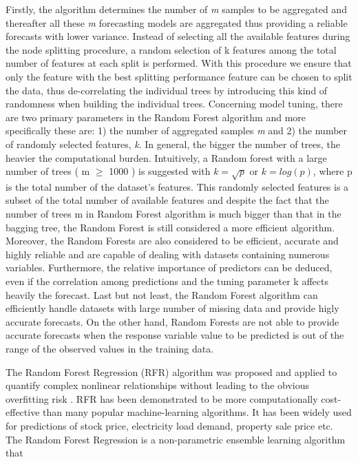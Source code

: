 Firstly, the algorithm determines the number of \textit{m} samples to be aggregated and thereafter all these \textit{m} forecasting models are aggregated thus providing a reliable forecasts with lower variance. Instead of selecting all the available features during the node splitting procedure, a random selection of k features among the total number of features at each split is performed. With this procedure we ensure that only the feature with the best splitting performance feature can be chosen to split the data, thus de-correlating the individual trees by introducing this kind of
randomness when building the individual trees. Concerning model tuning, there are two primary parameters in the Random Forest algorithm and more specifically these are: 1) the number of aggregated samples \textit{m} and 2) the number of randomly selected features, \textit{k}. In general, the bigger the number of trees, the heavier the computational burden. Intuitively, a Random forest with a large number of trees ( m $\geq$ 1000 ) is suggested with $k=\sqrt{p}$ or $k=log(p)$, where p is the total number of the dataset's features. This randomly selected features is a subset of the total number of available features and despite the fact that the number of trees m in Random Forest algorithm is much bigger than that in the bagging tree, the Random Forest is still considered a more efficient algorithm. Moreover, the Random Forests are also considered to be efficient, accurate and highly reliable and are capable of dealing with datasets containing numerous variables. Furthermore, the relative importance of predictors can be deduced, even if the correlation among predictions and the tuning parameter k affects heavily the forecast. Last but not least, the Random Forest algorithm can efficiently handle datasets with large number of missing data and provide higly accurate forecasts. On the other hand, Random Forests are not able to provide accurate forecasts when the response variable value to be predicted is out of the range of the observed values in the training data. 
\par The Random Forest Regression (RFR) algorithm was proposed and applied to quantify complex
nonlinear relationships without leading to the obvious overfitting risk \cite{segal2004machine}. RFR has been demonstrated
to be more computationally cost-effective than many popular machine-learning algorithms.
It has been widely used for predictions of stock price, electricity load demand, property sale price etc. The Random Forest Regression is a non-parametric ensemble learning algorithm that
